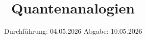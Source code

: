 

\subject{V23}
\title{Quantenanalogien}
\date{%
  Durchführung: 04.05.2026
  \hspace{3em}
  Abgabe: 10.05.2026
}




\maketitle
\thispagestyle{empty}
\tableofcontents
\newpage








\printbibliography{}



